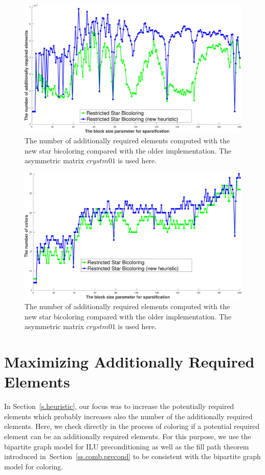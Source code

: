 \documentclass[12pt, twoside]{book}
\newcommand{\secref}[1]{Section~\protect\ref{#1}}
\begin{document}
\begin{figure}
\includegraphics[width=\linewidth]{bls_adds_crystm01_old_star_vs_new}
\caption{The number of additionally required elements computed with
the new star bicoloring compared with the older implementation.
The asymmetric matrix \textit{$crystm01$} is used here.}
\label{bls_adds_crystm01_old_star_vs_new}
\end{figure}

\begin{figure}
\includegraphics[width=\linewidth]{bls_cols_crystm01_old_star_vs_new}
\caption{The number of additionally required elements computed with
the new star bicoloring compared with the older implementation.
The asymmetric matrix \textit{$crystm01$} is used here.}
\label{bls_cols_crystm01_old_star_vs_new}
\end{figure}

\section{Maximizing Additionally Required Elements}
In \secref{s.heuristic}, our focus was to increase the potentially required elements
which probably increases also the number of the additionally required elements.
Here, we check directly in the process of coloring
if a potential required element can be an additionally required elements.
For this purpose, we use the bipartite graph model for ILU preconditioning
as well as the fill path theorem introduced
in~\secref{ss.comb.precond} to be consistent with the bipartite graph model for coloring.
\end{document}
